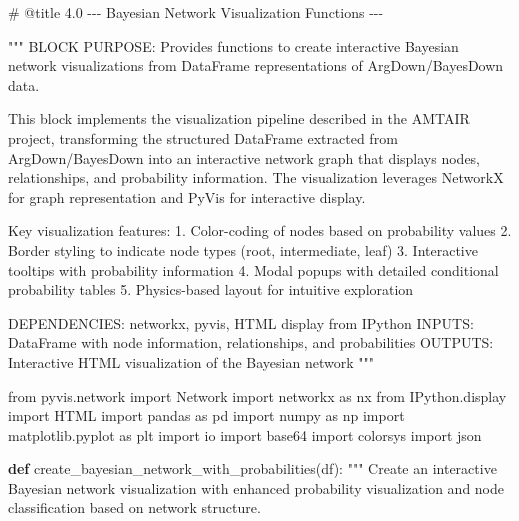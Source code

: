 \documentclass[
  11pt,
  letterpaper,
]{book}
\newenvironment{Shaded}{\begin{snugshade}}{\end{snugshade}}
\newcommand{\CommentTok}[1]{\textcolor[rgb]{0.37,0.37,0.37}{#1}}
\newcommand{\ImportTok}[1]{\textcolor[rgb]{0.00,0.46,0.62}{#1}}
\newcommand{\KeywordTok}[1]{\textcolor[rgb]{0.00,0.23,0.31}{\textbf{#1}}}
\newcommand{\NormalTok}[1]{\textcolor[rgb]{0.00,0.23,0.31}{#1}}
\begin{document}
\begin{Shaded}
\begin{Highlighting}[]
\CommentTok{\# @title 4.0 {-}{-}{-} Bayesian Network Visualization Functions {-}{-}{-}}

\CommentTok{"""}
\CommentTok{BLOCK PURPOSE: Provides functions to create interactive Bayesian network visualizations}
\CommentTok{from DataFrame representations of ArgDown/BayesDown data.}

\CommentTok{This block implements the visualization pipeline described in the AMTAIR project, transforming}
\CommentTok{the structured DataFrame extracted from ArgDown/BayesDown into an interactive network graph}
\CommentTok{that displays nodes, relationships, and probability information. The visualization leverages}
\CommentTok{NetworkX for graph representation and PyVis for interactive display.}

\CommentTok{Key visualization features:}
\CommentTok{1. Color{-}coding of nodes based on probability values}
\CommentTok{2. Border styling to indicate node types (root, intermediate, leaf)}
\CommentTok{3. Interactive tooltips with probability information}
\CommentTok{4. Modal popups with detailed conditional probability tables}
\CommentTok{5. Physics{-}based layout for intuitive exploration}

\CommentTok{DEPENDENCIES: networkx, pyvis, HTML display from IPython}
\CommentTok{INPUTS: DataFrame with node information, relationships, and probabilities}
\CommentTok{OUTPUTS: Interactive HTML visualization of the Bayesian network}
\CommentTok{"""}

\ImportTok{from}\NormalTok{ pyvis.network }\ImportTok{import}\NormalTok{ Network}
\ImportTok{import}\NormalTok{ networkx }\ImportTok{as}\NormalTok{ nx}
\ImportTok{from}\NormalTok{ IPython.display }\ImportTok{import}\NormalTok{ HTML}
\ImportTok{import}\NormalTok{ pandas }\ImportTok{as}\NormalTok{ pd}
\ImportTok{import}\NormalTok{ numpy }\ImportTok{as}\NormalTok{ np}
\ImportTok{import}\NormalTok{ matplotlib.pyplot }\ImportTok{as}\NormalTok{ plt}
\ImportTok{import}\NormalTok{ io}
\ImportTok{import}\NormalTok{ base64}
\ImportTok{import}\NormalTok{ colorsys}
\ImportTok{import}\NormalTok{ json}

\KeywordTok{def}\NormalTok{ create\_bayesian\_network\_with\_probabilities(df):}
    \CommentTok{"""}
\CommentTok{    Create an interactive Bayesian network visualization with enhanced probability visualization}
\CommentTok{    and node classification based on network structure.}


\end{Highlighting}
\end{Shaded}
\end{document}
